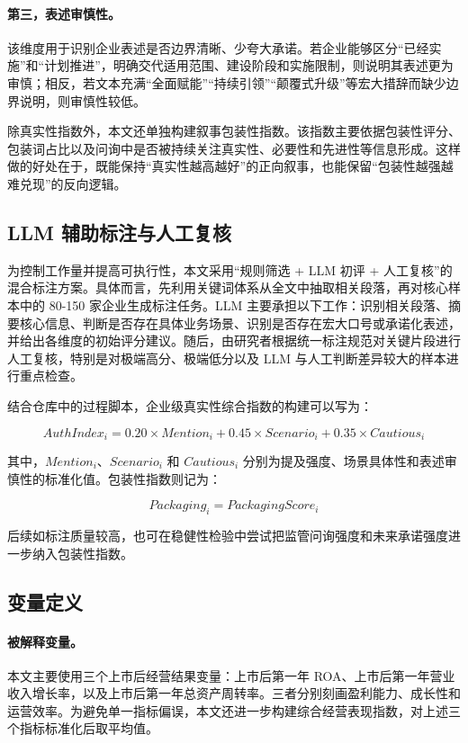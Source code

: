 \paragraph{第三，表述审慎性。} 该维度用于识别企业表述是否边界清晰、少夸大承诺。若企业能够区分“已经实施”和“计划推进”，明确交代适用范围、建设阶段和实施限制，则说明其表述更为审慎；相反，若文本充满“全面赋能”“持续引领”“颠覆式升级”等宏大措辞而缺少边界说明，则审慎性较低。

除真实性指数外，本文还单独构建叙事包装性指数。该指数主要依据包装性评分、包装词占比以及问询中是否被持续关注真实性、必要性和先进性等信息形成。这样做的好处在于，既能保持“真实性越高越好”的正向叙事，也能保留“包装性越强越难兑现”的反向逻辑。

\subsection{LLM 辅助标注与人工复核}

为控制工作量并提高可执行性，本文采用“规则筛选 + LLM 初评 + 人工复核”的混合标注方案。具体而言，先利用关键词体系从全文中抽取相关段落，再对核心样本中的 80-150 家企业生成标注任务。LLM 主要承担以下工作：识别相关段落、摘要核心信息、判断是否存在具体业务场景、识别是否存在宏大口号或承诺化表述，并给出各维度的初始评分建议。随后，由研究者根据统一标注规范对关键片段进行人工复核，特别是对极端高分、极端低分以及 LLM 与人工判断差异较大的样本进行重点检查。

结合仓库中的过程脚本，企业级真实性综合指数的构建可以写为：

\begin{equation}
AuthIndex_i = 0.20 \times Mention_i + 0.45 \times Scenario_i + 0.35 \times Cautious_i
\end{equation}

其中，$Mention_i$、$Scenario_i$ 和 $Cautious_i$ 分别为提及强度、场景具体性和表述审慎性的标准化值。包装性指数则记为：

\begin{equation}
Packaging_i = PackagingScore_i
\end{equation}

后续如标注质量较高，也可在稳健性检验中尝试把监管问询强度和未来承诺强度进一步纳入包装性指数。

\subsection{变量定义}

\paragraph{被解释变量。} 本文主要使用三个上市后经营结果变量：上市后第一年 ROA、上市后第一年营业收入增长率，以及上市后第一年总资产周转率。三者分别刻画盈利能力、成长性和运营效率。为避免单一指标偏误，本文还进一步构建综合经营表现指数，对上述三个指标标准化后取平均值。

